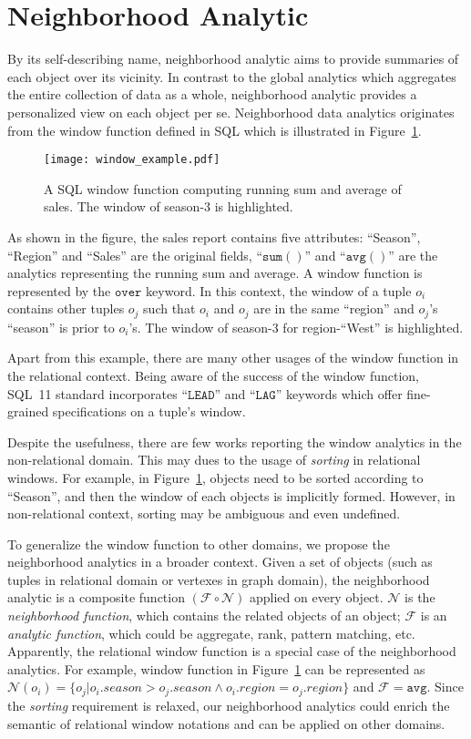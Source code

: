 \section{Neighborhood Analytic}
By its self-describing name, neighborhood analytic aims to provide
summaries of each object over its vicinity. In contrast to the global
analytics which aggregates the entire collection of data as a whole, neighborhood
analytic provides a personalized view on each object per se. Neighborhood
data analytics originates from the window function defined in  SQL which is
illustrated in Figure~\ref{fig:window}.

\begin{figure}[h]
\centering
\texttt{[image: window\_example.pdf]}
\caption{A SQL window function computing running sum and average of
sales. The window of season-3 is highlighted.} 
\label{fig:window}
\end{figure}

As shown in the figure, the sales report contains five attributes: 
``Season'', ``Region'' and ``Sales'' are the original fields, ``$\mathtt{sum()}$'' and ``$\mathtt{avg()}$''
are the analytics representing the running sum and average. A window function
is represented by the $\mathtt{over}$ keyword. In this context, the window of a tuple $o_i$
contains other tuples $o_j$ such that $o_i$ and $o_j$ are in the same ``region'' and $o_j$'s ``season'' is
prior to $o_i$'s. The window of season-$3$ for region-``West'' is highlighted.

Apart from this example, there are many other 
usages of the window function in the relational context. 
Being aware of the success of the window function, 
SQL~11 standard incorporates ``$\mathtt{LEAD}$'' and ``$\mathtt{LAG}$'' 
keywords which offer fine-grained specifications on a tuple's window.

Despite the usefulness, there are few works reporting the window
analytics in the non-relational domain. This may dues to the
usage of \emph{sorting} in relational windows. For example,
in Figure~\ref{fig:window},
objects need to be sorted according to ``Season'', and then the window of
each objects is implicitly formed. However, 
in non-relational context, sorting may be ambiguous and even undefined.

To generalize the window function to other domains, we propose the neighborhood
analytics in a broader context. Given a set of objects 
(such as tuples in relational domain or vertexes in graph domain),
the neighborhood analytic is a composite function
$(\mathcal{F} \circ \mathcal{N})$ applied on every object. $\mathcal{N}$
is the \emph{neighborhood function}, which contains the related objects of an object;
$\mathcal{F}$ is an \emph{analytic function}, which could be aggregate, rank,
pattern matching, etc.
Apparently, the relational window function is a special case of the
neighborhood analytics. For example, window function in Figure~\ref{fig:window} 
can be represented as $\mathcal{N}(o_i)=\{o_j | o_i.season > o_j.season \wedge o_i.region = o_j.region\}$
and $\mathcal{F} = \mathtt{avg}$.
Since the \emph{sorting} requirement is relaxed, our neighborhood analytics could
enrich the semantic of relational window notations 
and can be applied on other domains.